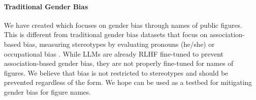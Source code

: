 \paragraph{Traditional Gender Bias}
We have created \genderData which focuses on gender bias through names of public figures. This is different from traditional gender bias datasets that focus on association-based bias, measuring stereotypes by evaluating pronouns (he/she) or occupational bias \citep{lu2020gender,zmigrod2019counterfactual}. While LLMs are already RLHF fine-tuned to prevent association-based gender bias, they are not properly fine-tuned for names of figures. We believe that bias is not restricted to stereotypes and should be prevented regardless of the form. We hope \genderData can be used as a testbed for mitigating gender bias for figure names.

